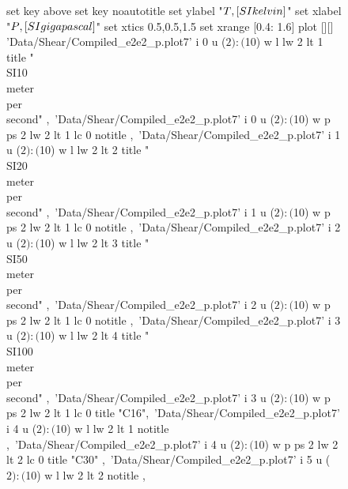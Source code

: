 \documentclass[aps,prb,reprint,superscriptaddress, a4paper]{revtex4-1}
\begin{document}
\begin{figure}
    	\begin{center}
		\begin{gnuplot}[terminal=pdf, terminaloptions={size \SERFigwidth cm, \SERFigheight cm color solid}]
			set key above
			set key noautotitle
			set ylabel "$T \\, [\\SI{}{\\kelvin}]$"
			set xlabel "$P \\, [\\SI{}{\\giga\\pascal}]$"
			set xtics 0.5,0.5,1.5 
			set xrange [0.4: 1.6]
			plot [][]	'Data/Shear/Compiled_e2e2_p.plot7' i 0 u ($2):($10) w l  lw 2  lt 1 title  "\\SI{10}{\\meter\\per\\second}" ,\
						'Data/Shear/Compiled_e2e2_p.plot7' i 0 u ($2):($10) w p ps 2   lw 2  lt 1 lc 0  notitle ,\
							'Data/Shear/Compiled_e2e2_p.plot7' i 1 u ($2):($10) w l  lw 2  lt 2 title  "\\SI{20}{\\meter\\per\\second}" ,\
							'Data/Shear/Compiled_e2e2_p.plot7' i 1 u ($2):($10) w p ps 2   lw 2  lt 1  lc 0  notitle ,\
						'Data/Shear/Compiled_e2e2_p.plot7' i 2 u ($2):($10) w l  lw 2  lt 3 title  "\\SI{50}{\\meter\\per\\second}"   ,\
						'Data/Shear/Compiled_e2e2_p.plot7' i 2 u ($2):($10) w p ps 2   lw 2  lt 1  lc 0  notitle   ,\
							'Data/Shear/Compiled_e2e2_p.plot7' i 3 u ($2):($10) w l  lw 2  lt 4 title  "\\SI{100}{\\meter\\per\\second}" ,\
							'Data/Shear/Compiled_e2e2_p.plot7' i 3 u ($2):($10) w p ps 2   lw 2  lt 1  lc 0  title "C16",\
						'Data/Shear/Compiled_e2e2_p.plot7' i 4 u ($2):($10) w l  lw 2  lt 1 notitle ,\
						'Data/Shear/Compiled_e2e2_p.plot7' i 4 u ($2):($10) w p ps 2   lw 2  lt 2 lc 0  title "C30" ,\
							'Data/Shear/Compiled_e2e2_p.plot7' i 5 u ($2):($10) w l  lw 2  lt 2 notitle ,\

\end{gnuplot}
\end{center}
\end{figure}
\end{document}
